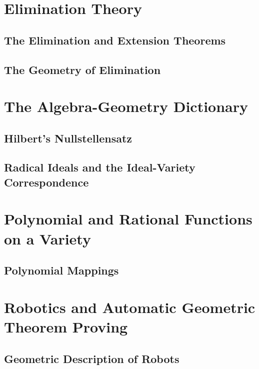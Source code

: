 \documentclass[10pt]{amsart}
\begin{document}
\begin{multicols*}{2}
\section{Elimination Theory}



\subsection{The Elimination and Extension Theorems}


\subsection{The Geometry of Elimination}



\section{The Algebra-Geometry Dictionary}


\subsection{Hilbert's Nullstellensatz}


\subsection{Radical Ideals and the Ideal-Variety Correspondence}



\section{Polynomial and Rational Functions on a Variety}


\subsection{Polynomial Mappings }


\section{Robotics and Automatic Geometric Theorem Proving}



\subsection{Geometric Description of Robots}







\end{multicols*}
\end{document}
